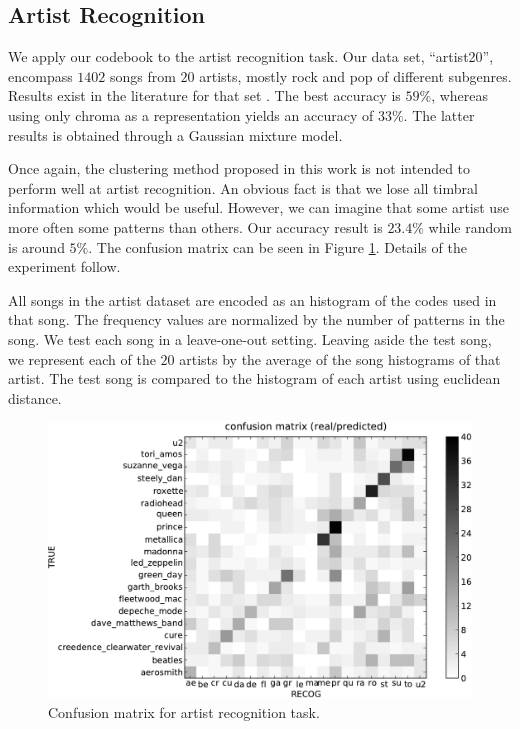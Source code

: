 \documentclass{article}
\begin{document}
\subsection{Artist Recognition} \label{ssec:artist}

We apply our codebook to the artist recognition task.
Our data set, ``artist20'', encompass $1402$ songs from $20$ artists, 
mostly rock and pop of different subgenres. Results exist in the
literature for that set \cite{Ellis2007}. The best accuracy is
$59\%$, whereas using only chroma as a representation yields an
accuracy of $33\%$. The latter results is obtained through a
Gaussian mixture model.

Once again, the clustering method proposed in this work is not
intended to perform well at artist recognition. An obvious fact is that
we lose all timbral information which would be useful. However, we can
imagine that some artist use more often some patterns than others.
Our accuracy result is $23.4\%$ while random
is around $5\%$. 
The confusion matrix can be seen in Figure \ref{fig:conf_mat}.
Details of the experiment follow.

All songs in the artist dataset are encoded as an histogram of the codes
used in that song. The frequency values are normalized by the number
of patterns in the song. We test each song in a leave-one-out setting.
Leaving aside the test song, we represent each of the $20$ artists by the 
average of
the song histograms of that artist. The test song is compared to
the histogram of each artist using euclidean distance.


\begin{figure}[htb]
\includegraphics[width=.9\columnwidth]{conf_mat_per_artist}
\caption{\small{Confusion matrix for artist recognition task.}}
\label{fig:conf_mat}
\end{figure}
\end{document}
